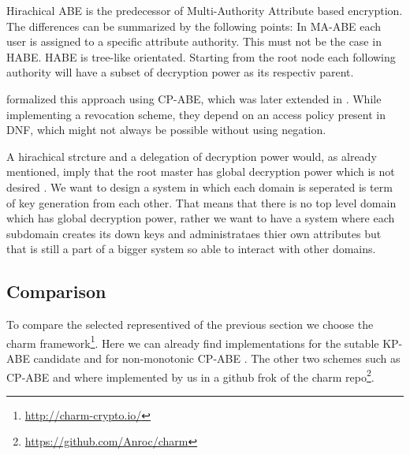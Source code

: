 Hirachical ABE is the predecessor of Multi-Authority Attribute based encryption. The differences can be summarized by the following points: In MA-ABE each user is assigned to a specific attribute authority. This must not be the case in HABE. HABE is tree-like orientated. Starting from the root node each following authority will have a subset of decryption power as its respectiv parent. 

\cite{Wang:2010:HAE:1866307.1866414} formalized this approach using CP-ABE, which was later extended in \cite{wang2011hierarchical}. While implementing a revocation scheme, they depend on an access policy present in DNF, which might not always be possible without using negation. 

A hirachical strcture and a delegation of decryption power would, as already mentioned, imply that the root master has global decryption power which is not desired . We want to design a system in which each domain is seperated is term of key generation from each other. That means that there is no top level domain which has global decryption power, rather we want to have a system where each subdomain creates its down keys and administrataes thier own attributes but that is still a part of a bigger system so able to interact with other domains.  



\subsection{Comparison}
To compare the selected representived of the previous section we choose the charm framework\footnote{\url{http://charm-crypto.io/}}. Here we can already find implementations for the sutable KP-ABE candidate \cite{lewko2010revocation} and for non-monotonic CP-ABE \cite{10.1007/978-3-642-54631-0_16}. The other two schemes such as CP-ABE \cite{liu2016practical} and \cite{wang2011hierarchical} where implemented by us in a github frok of the charm repo\footnote{\url{https://github.com/Anroc/charm}}. 

